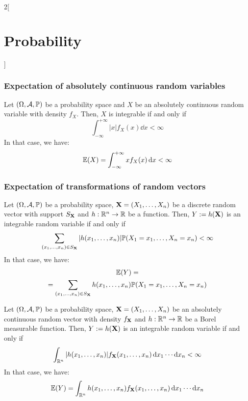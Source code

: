\documentclass[../../../main.tex]{subfiles}
\begin{document}
\begin{multicols}{2}[\section{Probability}]
  \subsubsection{Expectation of absolutely continuous random variables}
  \begin{theorem}
    Let $(\Omega,\mathcal{A},\mathbb{P})$ be a probability space and $X$ be an absolutely continuous random variable with density $f_X$. Then, $X$ is integrable if and only if $$\int_{-\infty}^{+\infty}|x|f_X(x)\dd{x}<\infty$$
    In that case, we have: $$\mathbb{E}(X)=\int_{-\infty}^{+\infty}xf_X(x)\dd{x}<\infty$$
  \end{theorem}
  \subsubsection{Expectation of transformations of random vectors}
  \begin{proposition}
    Let $(\Omega,\mathcal{A},\mathbb{P})$ be a probability space, $\boldsymbol{\mathrm{X}}=(X_1,\ldots,X_n)$ be a discrete random vector with support $S_{\boldsymbol{\mathrm{X}}}$ and $h:\mathbb{R}^n\rightarrow\mathbb{R}$ be a function. Then, $Y:=h(\boldsymbol{\mathrm{X}})$ is an integrable random variable if and only if $$\sum_{(x_1,\ldots,x_n)\in S_{\boldsymbol{\mathrm{X}}}}|h(x_1,\ldots,x_n)|\mathbb{P}(X_1=x_1,\ldots,X_n=x_n)<\infty$$
    In that case, we have:
    \begin{multline*}
      \mathbb{E}(Y)=\\=\sum_{(x_1,\ldots,x_n)\in S_{\boldsymbol{\mathrm{X}}}}h(x_1,\ldots,x_n)\mathbb{P}(X_1=x_1,\ldots,X_n=x_n)
    \end{multline*}
  \end{proposition}
  \begin{proposition}
    Let $(\Omega,\mathcal{A},\mathbb{P})$ be a probability space, $\boldsymbol{\mathrm{X}}=(X_1,\ldots,X_n)$ be an absolutely continuous random vector with density $f_{\boldsymbol{\mathrm{X}}}$ and $h:\mathbb{R}^n\rightarrow\mathbb{R}$ be a Borel measurable function. Then, $Y:=h(\boldsymbol{\mathrm{X}})$ is an integrable random variable if and only if $$\int_{\mathbb{R}^n}|h(x_1,\ldots,x_n)|f_{\boldsymbol{\mathrm{X}}}(x_1,\ldots,x_n)\dd{x_1}\cdots\dd{x_n}<\infty$$
    In that case, we have:
    $$
      \mathbb{E}(Y)=\int_{\mathbb{R}^n}h(x_1,\ldots,x_n)f_{\boldsymbol{\mathrm{X}}}(x_1,\ldots,x_n)\dd{x_1}\cdots\dd{x_n}$$
  \end{proposition}

\end{multicols}
\end{document}
